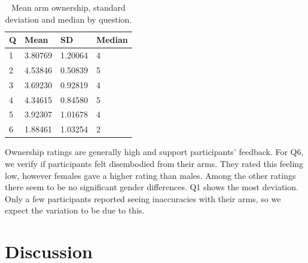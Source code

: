 \begin{table}[H]
\centering
\begin{tabular}{|llll|}
\hline
Q & Mean & SD & Median \\
\hline
1 & 3.80769 & 1.20064& 4 \\  
2 & 4.53846 & 0.50839& 5\\  
3 & 3.69230 &  0.92819& 4\\  
4 & 4.34615 & 0.84580& 5\\  
5 & 3.92307 &  1.01678&4 \\  
6 & 1.88461 &  1.03254& 2\\  
\hline
\end{tabular}
\caption{Mean arm ownership, standard deviation and median by question.}
\label{tbl:own}
\end{table} 

Ownership ratings are generally high and support participants' feedback. For Q6, we verify if participants felt disembodied from their arms. They rated this feeling low, however females gave a higher rating than males. Among the other ratings there seem to be no significant gender differences.
Q1 shows the most deviation. Only a few participants reported seeing inaccuracies with their arms, so we expect the variation to be due to this.\\

\section{Discussion}

